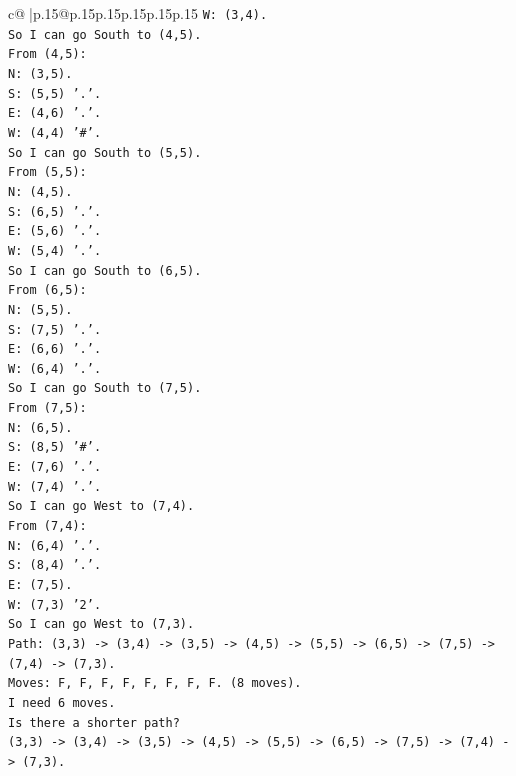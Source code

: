 \documentclass{article}
\begin{document}
{\begin{supertabular}{c@{$\;$}|p{.15\linewidth}@{}p{.15\linewidth}p{.15\linewidth}p{.15\linewidth}p{.15\linewidth}p{.15\linewidth}}
{{{\texttt{W: (3,4).} \\
\texttt{So I can go South to (4,5).} \\
\texttt{From (4,5):} \\
\texttt{N: (3,5).} \\
\texttt{S: (5,5) '.'.} \\
\texttt{E: (4,6) '.'.} \\
\texttt{W: (4,4) '\#'.} \\
\texttt{So I can go South to (5,5).} \\
\texttt{From (5,5):} \\
\texttt{N: (4,5).} \\
\texttt{S: (6,5) '.'.} \\
\texttt{E: (5,6) '.'.} \\
\texttt{W: (5,4) '.'.} \\
\texttt{So I can go South to (6,5).} \\
\texttt{From (6,5):} \\
\texttt{N: (5,5).} \\
\texttt{S: (7,5) '.'.} \\
\texttt{E: (6,6) '.'.} \\
\texttt{W: (6,4) '.'.} \\
\texttt{So I can go South to (7,5).} \\
\texttt{From (7,5):} \\
\texttt{N: (6,5).} \\
\texttt{S: (8,5) '\#'.} \\
\texttt{E: (7,6) '.'.} \\
\texttt{W: (7,4) '.'.} \\
\texttt{So I can go West to (7,4).} \\
\texttt{From (7,4):} \\
\texttt{N: (6,4) '.'.} \\
\texttt{S: (8,4) '.'.} \\
\texttt{E: (7,5).} \\
\texttt{W: (7,3) '2'.} \\
\texttt{So I can go West to (7,3).} \\
\texttt{Path: (3,3) {-}> (3,4) {-}> (3,5) {-}> (4,5) {-}> (5,5) {-}> (6,5) {-}> (7,5) {-}> (7,4) {-}> (7,3).} \\
\texttt{Moves: F, F, F, F, F, F, F, F. (8 moves).} \\
\texttt{I need 6 moves.} \\
\texttt{Is there a shorter path?} \\
\texttt{(3,3) {-}> (3,4) {-}> (3,5) {-}> (4,5) {-}> (5,5) {-}> (6,5) {-}> (7,5) {-}> (7,4) {-}> (7,3).} \\
}}}
\end{supertabular}}
\end{document}
